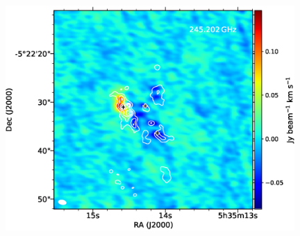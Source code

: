\begin{figure}[H]
\begin{center}
\begin{minipage}{0.98\textwidth}
\begin{center}
\begin{minipage}{0.48\textwidth}
\begin{center}
\includegraphics[width=0.98\textwidth]{OrionKL/mom0/245.202mom0_3-7.eps}
\end{center}
\end{minipage}
\end{center}
\end{minipage}



\end{center}
\end{figure}
